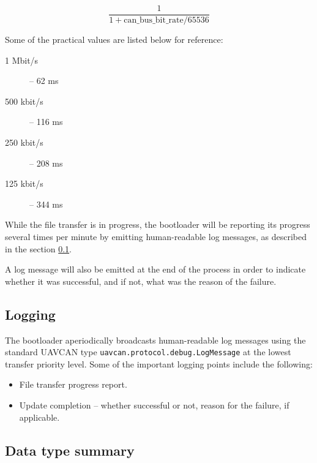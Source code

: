 \documentclass{zubaxdoc}
\begin{document}
\begin{equation}
\frac{1}{1 + {\text{can{\_}bus{\_}bit{\_}rate}}/{65536}}
\end{equation}

Some of the practical values are listed below for reference:
\begin{description}
    \item[1 Mbit/s] -- 62 ms
    \item[500 kbit/s] -- 116 ms
    \item[250 kbit/s] -- 208 ms
    \item[125 kbit/s] -- 344 ms
\end{description}

While the file transfer is in progress,
the bootloader will be reporting its progress several times per minute
by emitting human-readable log messages,
as described in the section \ref{sec:uavcan_bootloader_logging}.

A log message will also be emitted at the end of the process in order to indicate whether it was successful,
and if not, what was the reason of the failure.

\subsection{Logging}\label{sec:uavcan_bootloader_logging}

The bootloader aperiodically broadcasts human-readable log messages using the standard UAVCAN type
\verb|uavcan.protocol.debug.LogMessage| at the lowest transfer priority level.
Some of the important logging points include the following:
\begin{itemize}
    \item File transfer progress report.
    \item Update completion -- whether successful or not, reason for the failure, if applicable.
\end{itemize}

\subsection{Data type summary}
\end{document}
